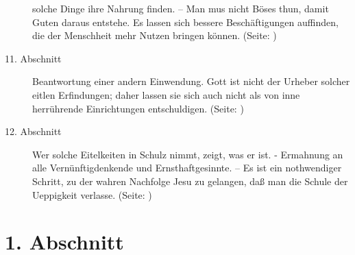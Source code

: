 \begin{description}
solche Dinge ihre Nahrung finden. -- Man mus nicht Böses thun, damit Guten
daraus entstehe. Es lassen sich bessere Beschäftigungen auffinden, die der
Menschheit mehr Nutzen bringen können. (Seite: \pageref{kap17_ab10})
\item[11. Abschnitt] Beantwortung einer andern Einwendung. Gott ist nicht der
Urheber solcher eitlen Erfindungen; daher lassen sie sich auch nicht als von
inne herrührende Einrichtungen entschuldigen. (Seite: \pageref{kap17_ab11})
\item[12. Abschnitt] Wer solche Eitelkeiten in Schulz nimmt, zeigt, was er ist.
- Ermahnung an alle Vernünftigdenkende und Ernsthaftgesinnte. -- Es ist ein
nothwendiger Schritt, zu der wahren Nachfolge Jesu zu gelangen, daß man die
Schule der Ueppigkeit verlasse. (Seite: \pageref{kap17_ab12})

\end{description}
\normalsize

\section{1. Abschnitt} \label{kap17_ab1}

